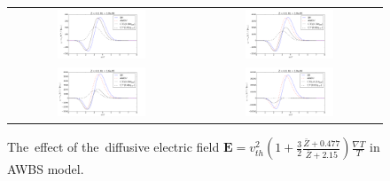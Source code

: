 \documentclass[preprint,12pt]{elsarticle}
\newcommand{\vect}[1]{\boldsymbol{#1}}
\newcommand{\Zbar}{\bar{Z}}
\newcommand{\vth}{v_{th}}
\newcommand{\E}{\vect{E}}
\newcounter{bla}
\begin{document}
\begin{figure}[tbh]
  \begin{center}
    \begin{tabular}{cc}
      \includegraphics[width=0.5\textwidth]{../results/fe_analysis/figs/Efield_P8_Kn1e-6_Z4.png} &
      \includegraphics[width=0.5\textwidth]{../results/fe_analysis/figs/Efield_P8_Kn1e-5_Z4.png} \\
       \includegraphics[width=0.5\textwidth]{../results/fe_analysis/figs/Efield_P8_Kn16e-6_Z4.png} &
      \includegraphics[width=0.5\textwidth]{../results/fe_analysis/figs/Efield_P8_Kn1e-4_Z4.png}     
    \end{tabular}
  \caption{
  The~effect of the~diffusive electric field $\E = \vth^2\left(1 + 
  \frac{3}{2}\frac{\Zbar + 0.477}{\Zbar + 2.15}\right)\frac{\nabla T}{T}$ 
  in AWBS model.
  }
  \end{center}
  \label{fig:EfieldAWBS}
\end{figure}
\end{document}
